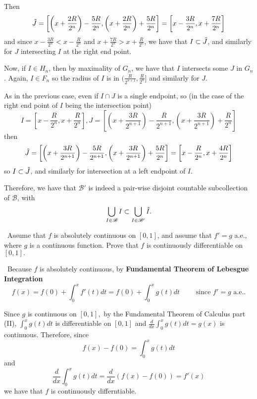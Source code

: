 \documentclass[12pt]{Qual}
\begin{document}
\begin{solution}
Then $$\Tilde{J}=\left[\left(x+\frac{2R}{2^n}\right)-\frac{5R}{2^n},\left(x+\frac{2R}{2^n}\right)+\frac{5R}{2^n}\right]=\left[x-\frac{3R}{2^n},x+\frac{7R}{2^n}\right]$$ and since $x-\frac{3R}{2^n}<x-\frac{R}{2^n}$ and $x+\frac{7R}{2^n}>x+\frac{R}{2^n}$, we have that $I\subset\Tilde{J}$, and similarly for $J$ intersecting $I$ at the right end point.

Now, if $I\in H_n$, then by maximality of $G_n$, we have that $I$ intersects some $J$ in $G_n$. Again, $I\in F_n$ so the radius of $I$ is in $(\frac{R}{2^{n+1}},\frac{R}{2^n}]$ and similarly for $J$.

As in the previous case, even if $I\cap J$ is a single endpoint, so (in the case of the right end point of $I$ being the intersection point) $$I=\left[x-\frac{R}{2^n},x+\frac{R}{2^n}\right], J=\left[\left(x+\frac{3R}{2^{n+1}}\right)-\frac{R}{2^{n+1}},\left(x+\frac{3R}{2^{n+1}}\right)+\frac{R}{2^n}\right]$$ then $$\Tilde{J}=\left[\left(x+\frac{3R}{2^{n+1}}\right)-\frac{5R}{2^{n+1}},\left(x+\frac{3R}{2^{n+1}}\right)+\frac{5R}{2^n}\right]=\left[x-\frac{R}{2^n},x+\frac{4R}{2^n}\right]$$ so $I\subset\Tilde{J}$, and similarly for intersection at a left endpoint of $I.$

Therefore, we have that $\mathscr{B}'$ is indeed a pair-wise disjoint countable subcollection of $\mathscr{B}$, with $$\bigcup_{I\in\mathscr{B}}I\subset\bigcup_{I\in\mathscr{B}'}\Tilde{I}.$$

\end{solution}
\newpage



\begin{problem} $\,$
Assume that $f$ is absolutely continuous on $[0,1]$, and assume that $f'=g$ a.e., where $g$ is a continuous function. Prove that $f$ is continuously differentiable on $[0,1].$
\end{problem}


\begin{solution}$\,$
Because $f$ is absolutely continuous, by \textbf{Fundamental Theorem of Lebesgue Integration} $$f(x)=f(0)+\int_0^xf'(t)dt=f(0)+\int_0^xg(t)dt\qquad\text{ since }f'=g\text{ a.e.}.$$

Since $g$ is continuous on $[0,1],$ by the Fundamental Theorem of Calculus part (II), $\displaystyle \int_0^xg(t)dt$ is differentiable on $[0,1]$ and $\displaystyle \frac{d}{dx}\int_0^xg(t)dt=g(x)$ is continuous. Therefore, since $$f(x)-f(0)=\int_0^xg(t)dt$$ and $$\frac{d}{dx}\int_0^xg(t)dt=\frac{d}{dx}(f(x)-f(0))=f'(x)$$ we have that $f$ is continuously differntiable.
\end{solution}
\newpage
\end{document}
